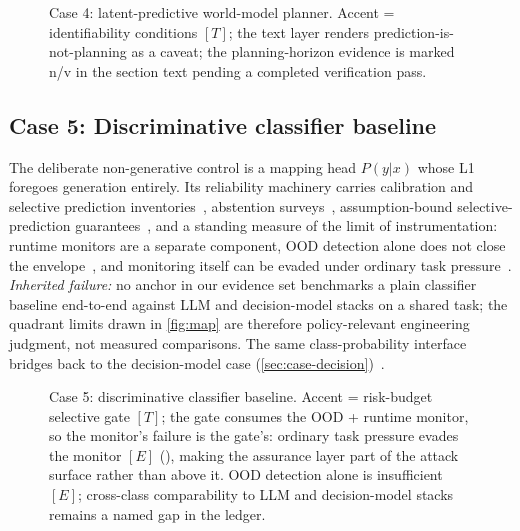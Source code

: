 \begin{figure}[h!]
  \centering
  \resizebox{\linewidth}{!}{}
  \caption{Case 4: latent-predictive world-model planner. Accent = identifiability conditions $[T]$; the text layer renders prediction-is-not-planning as a caveat; the planning-horizon evidence is marked n/v in the section text pending a completed verification pass.}
  \label{fig:case-jepa}
\end{figure}

\subsection{Case 5: Discriminative classifier baseline}
\label{sec:case-classifier}
The deliberate non-generative control is a mapping head $P(y|x)$ whose L1 foregoes generation
entirely. Its reliability machinery carries calibration and
selective prediction inventories~\cite{id231108298,id250315850}, abstention
surveys~\cite{id240718418}, assumption-bound selective-prediction
guarantees~\cite{id260704430}, and a standing measure of the limit of instrumentation: runtime
monitors are a separate component, OOD detection alone does not close the
envelope~\cite{id221116158}, and monitoring itself can be evaded under ordinary task
pressure~\cite{id260930217}. \emph{Inherited failure:} no anchor in our evidence set benchmarks
a plain classifier baseline end-to-end against LLM and decision-model stacks on a shared task;
the quadrant limits drawn in \cref{fig:map} are therefore policy-relevant engineering judgment,
not measured comparisons. The same class-probability interface bridges back to the
decision-model case (\cref{sec:case-decision})~\cite{id261002267}.

\begin{figure}[h!]
  \centering
  \resizebox{\linewidth}{!}{}
  \caption{ Case 5: discriminative classifier baseline. Accent = risk-budget selective gate $[T]$; the gate consumes the OOD + runtime monitor, so the monitor's failure is the gate's: ordinary task pressure evades the monitor $[E]$ (\cite{id260930217}), making the assurance layer part of the attack surface rather than above it. OOD detection alone is insufficient $[E]$; cross-class comparability to LLM and decision-model stacks remains a named gap in the ledger.}
  \label{fig:case-classifier}
\end{figure}

